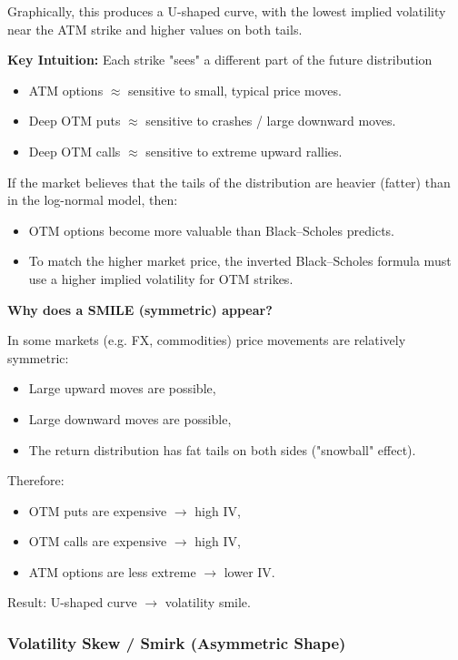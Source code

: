 \documentclass[12pt,a4paper]{article}
\theoremstyle{definition}
\begin{document}
Graphically, this produces a U-shaped curve, with the lowest implied volatility near the ATM strike and higher values on both tails.

\textbf{Key Intuition:} Each strike "sees" a different part of the future distribution
\begin{itemize}
\item ATM options $\approx$ sensitive to small, typical price moves.
\item Deep OTM puts $\approx$ sensitive to crashes / large downward moves.
\item Deep OTM calls $\approx$ sensitive to extreme upward rallies.
\end{itemize}

If the market believes that the tails of the distribution are heavier (fatter) than in the log-normal model, then:
\begin{itemize}
\item OTM options become more valuable than Black–Scholes predicts.
\item To match the higher market price, the inverted Black–Scholes formula must use a higher implied volatility for OTM strikes.
\end{itemize}

\textbf{Why does a SMILE (symmetric) appear?}

In some markets (e.g. FX, commodities) price movements are relatively symmetric:
\begin{itemize}
\item Large upward moves are possible,
\item Large downward moves are possible,
\item The return distribution has fat tails on both sides ("snowball" effect).
\end{itemize}

Therefore:
\begin{itemize}
\item OTM puts are expensive $\rightarrow$ high IV,
\item OTM calls are expensive $\rightarrow$ high IV,
\item ATM options are less extreme $\rightarrow$ lower IV.
\end{itemize}

Result: U-shaped curve $\rightarrow$ volatility smile.

\subsubsection{Volatility Skew / Smirk (Asymmetric Shape)}
\end{document}
